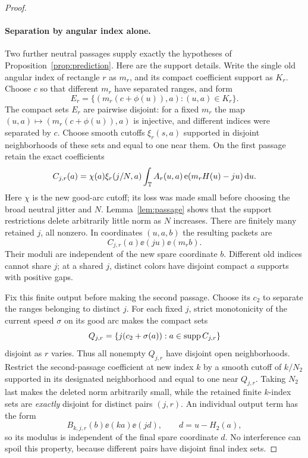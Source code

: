 \begin{proof}
\paragraph{Separation by angular index alone.}
Two further neutral passages supply exactly the hypotheses of
Proposition~\ref{prop:prediction}.  Here are the support details.
Write the single old angular index of rectangle $r$ as $m_r$, and its
compact coefficient support as $K_r$.  Choose $c$ so that different
$m_r$ have separated ranges, and form
\[
 E_r=\{(m_r(c+\phi(u)),a):(u,a)\in K_r\}.
\]
The compact sets $E_r$ are pairwise disjoint: for a fixed $m_r$ the map
$(u,a)\mapsto(m_r(c+\phi(u)),a)$ is injective, and different indices
were separated by $c$.  Choose smooth cutoffs $\xi_r(s,a)$ supported
in disjoint neighborhoods of these sets and equal to one near them.
On the first passage retain the exact coefficients
\begin{equation}\label{eq:first-separation}
 C_{j,r}(a)=\chi(a)\xi_r(j/N,a)
 \int_\mathbb T A_r(u,a)\operatorname{e}(m_rH(u)-ju)\,\mathrm d u.
\end{equation}
Here $\chi$ is the new good-arc cutoff; its loss was made small before
choosing the broad neutral jitter and $N$.  Lemma~\ref{lem:passage}
shows that the support restrictions delete arbitrarily little norm as
$N$ increases.  There are finitely many retained $j$, all nonzero.  In
coordinates $(u,a,b)$ the resulting packets are
\[
 C_{j,r}(a)\ee(ju)\ee(m_rb).
\]
Their moduli are independent of the new spare coordinate $b$.
Different old indices cannot share $j$; at a shared $j$, distinct colors
have disjoint compact $a$ supports with positive gaps.

Fix this finite output before making the second passage.  Choose its
$c_2$ to separate the ranges belonging to distinct $j$.  For each fixed
$j$, strict monotonicity of the current speed $\sigma$ on its good arc
makes the compact sets
\[
 Q_{j,r}=\{j(c_2+\sigma(a)):a\in\operatorname{supp} C_{j,r}\}
\]
disjoint as $r$ varies.  Thus all nonempty $Q_{j,r}$ have disjoint open
neighborhoods.  Restrict the second-passage coefficient at new index
$k$ by a smooth cutoff of $k/N_2$ supported in its designated
neighborhood and equal to one near $Q_{j,r}$.  Taking $N_2$ last makes
the deleted norm arbitrarily small, while the retained finite
$k$-index sets are \emph{exactly} disjoint for distinct pairs $(j,r)$.
An individual output term has the form
\[
 B_{k,j,r}(b)\ee(ka)\ee(jd),\qquad d=u-H_2(a),
\]
so its modulus is independent of the final spare coordinate $d$.
No interference can spoil this property, because different pairs have
disjoint final index sets.


\end{proof}
